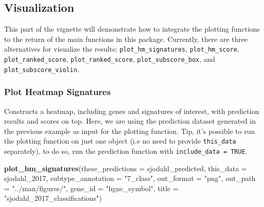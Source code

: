 \documentclass[
]{article}
\newenvironment{Shaded}{\begin{snugshade}}{\end{snugshade}}
\newcommand{\AttributeTok}[1]{\textcolor[rgb]{0.13,0.29,0.53}{#1}}
\newcommand{\FunctionTok}[1]{\textcolor[rgb]{0.13,0.29,0.53}{\textbf{#1}}}
\newcommand{\NormalTok}[1]{#1}
\newcommand{\StringTok}[1]{\textcolor[rgb]{0.31,0.60,0.02}{#1}}
\begin{document}
\subsection{Visualization}\label{visualization}

This part of the vignette will demonstrate how to integrate the plotting
functions to the return of the main functions in this package.
Currently, there are three alternatives for visualize the results;
\texttt{plot\_hm\_signatures}, \texttt{plot\_hm\_score},
\texttt{plot\_ranked\_score}, \texttt{plot\_ranked\_score},
\texttt{plot\_subscore\_box}, and \texttt{plot\_subscore\_violin}.

\subsubsection{Plot Heatmap Signatures}\label{plot-heatmap-signatures}

Constructs a heatmap, including genes and signatures of interest, with
prediction results and scores on top. Here, we are using the prediction
dataset generated in the previous example as input for the plotting
function. Tip, it's possible to run the plotting function on just one
object (i.e no need to provide \texttt{this\_data} separately), to do
so, run the prediction function with \texttt{include\_data\ =\ TRUE}.

\begin{Shaded}
\begin{Highlighting}[]
\FunctionTok{plot\_hm\_signatures}\NormalTok{(}\AttributeTok{these\_predictions =}\NormalTok{ sjodahl\_predicted, }
                   \AttributeTok{this\_data =}\NormalTok{ sjodahl\_2017,}
                   \AttributeTok{subtype\_annotation =} \StringTok{"7\_class"}\NormalTok{,}
                   \AttributeTok{out\_format =} \StringTok{"png"}\NormalTok{, }
                   \AttributeTok{out\_path =} \StringTok{"../man/figures/"}\NormalTok{, }
                   \AttributeTok{gene\_id =} \StringTok{"hgnc\_symbol"}\NormalTok{, }
                   \AttributeTok{title =} \StringTok{"sjodahl\_2017\_classifications"}\NormalTok{)}
\end{Highlighting}
\end{Shaded}
\end{document}
